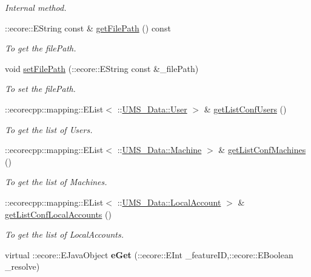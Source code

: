 \begin{DoxyCompactItemize}
\begin{DoxyCompactList}\small\item\em Internal method. \item\end{DoxyCompactList}\item 
::ecore::EString const \& \hyperlink{classUMS__Data_1_1Configuration_a3e4da79ba133f0b7d41739e819121f82}{getFilePath} () const 
\begin{DoxyCompactList}\small\item\em To get the filePath. \item\end{DoxyCompactList}\item 
void \hyperlink{classUMS__Data_1_1Configuration_a2d8c529bb25a0fde50304b759d85b49b}{setFilePath} (::ecore::EString const \&\_\-filePath)
\begin{DoxyCompactList}\small\item\em To set the filePath. \item\end{DoxyCompactList}\item 
::ecorecpp::mapping::EList$<$ ::\hyperlink{classUMS__Data_1_1User}{UMS\_\-Data::User} $>$ \& \hyperlink{classUMS__Data_1_1Configuration_a1ef1498084b34ac1854caca0c8a1bb1a}{getListConfUsers} ()
\begin{DoxyCompactList}\small\item\em To get the list of Users. \item\end{DoxyCompactList}\item 
::ecorecpp::mapping::EList$<$ ::\hyperlink{classUMS__Data_1_1Machine}{UMS\_\-Data::Machine} $>$ \& \hyperlink{classUMS__Data_1_1Configuration_a9dbf41f45be7bfbcd706883209ef6975}{getListConfMachines} ()
\begin{DoxyCompactList}\small\item\em To get the list of Machines. \item\end{DoxyCompactList}\item 
::ecorecpp::mapping::EList$<$ ::\hyperlink{classUMS__Data_1_1LocalAccount}{UMS\_\-Data::LocalAccount} $>$ \& \hyperlink{classUMS__Data_1_1Configuration_ac37d9113f77db4f32e92eed18f9538b0}{getListConfLocalAccounts} ()
\begin{DoxyCompactList}\small\item\em To get the list of LocalAccounts. \item\end{DoxyCompactList}\item 
\hypertarget{classUMS__Data_1_1Configuration_ae8768c2f986d628f3d7d9c2a1274afad}{
virtual ::ecore::EJavaObject {\bfseries eGet} (::ecore::EInt \_\-featureID,::ecore::EBoolean \_\-resolve)}
\label{classUMS__Data_1_1Configuration_ae8768c2f986d628f3d7d9c2a1274afad}


\end{DoxyCompactItemize}
